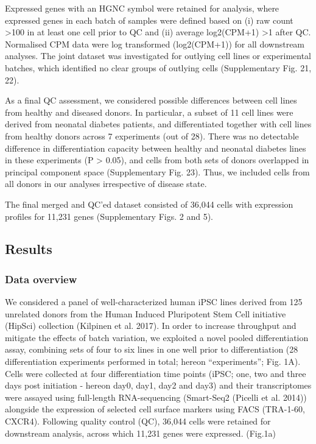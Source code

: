 Expressed genes with an HGNC symbol were retained for analysis, where expressed genes in each batch of samples were defined based on (i) raw count >100 in at least one cell prior to QC and (ii) average log2(CPM+1) >1 after QC. Normalised CPM data were log transformed (log2(CPM+1)) for all downstream analyses. The joint dataset was investigated for outlying cell lines or experimental batches, which identified no clear groups of outlying cells (Supplementary Fig. 21, 22). 

As a final QC assessment, we considered possible differences between cell lines from healthy and diseased donors. In particular, a subset of 11 cell lines were derived from neonatal diabetes patients, and differentiated together with cell lines from healthy donors across 7 experiments (out of 28). There was no detectable difference in differentiation capacity between healthy and neonatal diabetes lines in these experiments (P > 0.05), and cells from both sets of donors overlapped in principal component space (Supplementary Fig. 23). Thus, we included cells from all donors in our analyses irrespective of disease state.

The final merged and QC’ed dataset consisted of 36,044 cells with expression profiles for 11,231 genes (Supplementary Figs. 2 and 5).


\subsection{Results}

\subsubsection{Data overview}

 We considered a panel of well-characterized human iPSC lines derived from 125 unrelated donors from the Human Induced Pluripotent Stem Cell initiative (HipSci) collection (Kilpinen et al. 2017). In order to increase throughput and mitigate the effects of batch variation, we exploited a novel pooled differentiation assay, combining sets of four to six lines in one well prior to differentiation (28 differentiation experiments performed in total; hereon “experiments”; Fig. 1A). Cells were collected at four differentiation time points (iPSC; one, two and three days post initiation - hereon day0, day1, day2 and day3) and their transcriptomes were assayed using full-length RNA-sequencing (Smart-Seq2 (Picelli et al. 2014)) alongside the expression of selected cell surface markers using FACS (TRA-1-60, CXCR4). Following quality control (QC), 36,044 cells were retained for downstream analysis, across which 11,231 genes were expressed.
 (Fig.1a)
 

